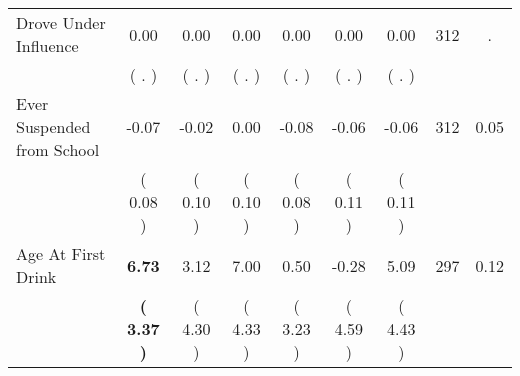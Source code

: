 \begin{tabular}{lcccccccc}
Drove Under Influence &      0.00 &      0.00 &      0.00 &      0.00 &      0.00 &      0.00 & 312 &          . \\ 
 & (        . ) & (        . ) & (        . ) & (        . ) & (        . ) & (        . ) & \\
Ever Suspended from School &     -0.07 &     -0.02 &      0.00 &     -0.08 &     -0.06 &     -0.06 & 312 &       0.05 \\ 
 & (     0.08 ) & (     0.10 ) & (     0.10 ) & (     0.08 ) & (     0.11 ) & (     0.11 ) & \\
Age At First Drink & \textbf{     6.73} &      3.12 &      7.00 &      0.50 &     -0.28 &      5.09 & 297 &       0.12 \\ 
 & \textbf{(     3.37 )} & (     4.30 ) & (     4.33 ) & (     3.23 ) & (     4.59 ) & (     4.43 ) & \\
\bottomrule
\end{tabular}
